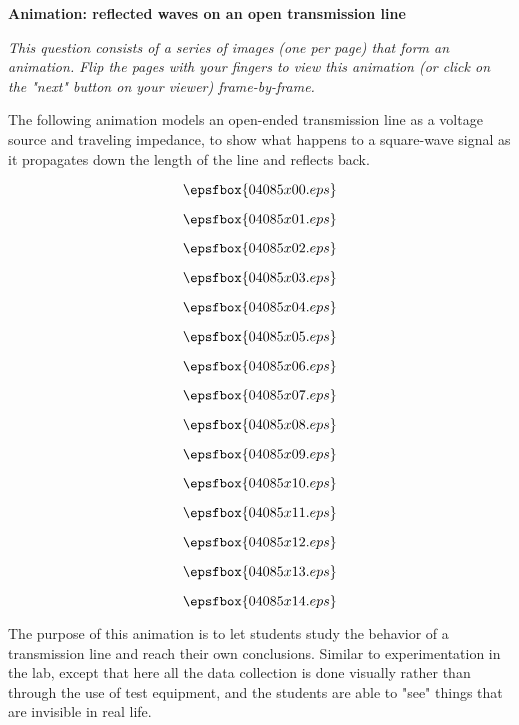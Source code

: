 

\centerline{\bf Animation: reflected waves on an open transmission line}

\vskip 10pt

{\it This question consists of a series of images (one per page) that form an animation.  Flip the pages with your fingers to view this animation (or click on the "next" button on your viewer) frame-by-frame.}

\vskip 10pt

The following animation models an open-ended transmission line as a voltage source and traveling impedance, to show what happens to a square-wave signal as it propagates down the length of the line and reflects back.

\vfil \eject
$$\epsfbox{04085x00.eps}$$

\vfil \eject
$$\epsfbox{04085x01.eps}$$

\vfil \eject
$$\epsfbox{04085x02.eps}$$

\vfil \eject
$$\epsfbox{04085x03.eps}$$

\vfil \eject
$$\epsfbox{04085x04.eps}$$

\vfil \eject
$$\epsfbox{04085x05.eps}$$

\vfil \eject
$$\epsfbox{04085x06.eps}$$

\vfil \eject
$$\epsfbox{04085x07.eps}$$

\vfil \eject
$$\epsfbox{04085x08.eps}$$

\vfil \eject
$$\epsfbox{04085x09.eps}$$

\vfil \eject
$$\epsfbox{04085x10.eps}$$

\vfil \eject
$$\epsfbox{04085x11.eps}$$

\vfil \eject
$$\epsfbox{04085x12.eps}$$

\vfil \eject
$$\epsfbox{04085x13.eps}$$

\vfil \eject
$$\epsfbox{04085x14.eps}$$


\vfil \eject














The purpose of this animation is to let students study the behavior of a transmission line and reach their own conclusions.  Similar to experimentation in the lab, except that here all the data collection is done visually rather than through the use of test equipment, and the students are able to "see" things that are invisible in real life.




